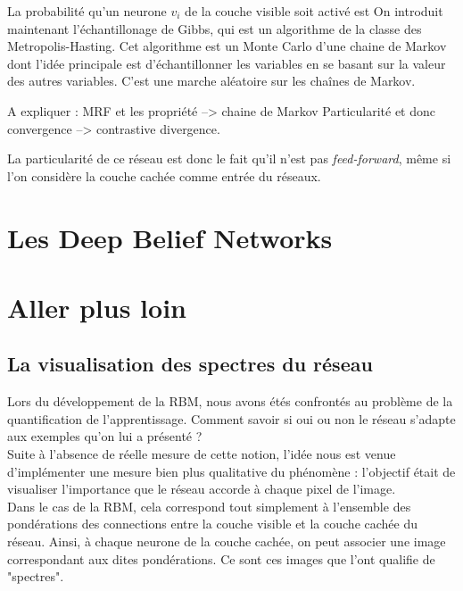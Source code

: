 \documentclass[a4paper,twoside]{report}
\begin{document}
                La probabilité qu'un neurone \begin{math}v_{i}\end{math} de la
                couche visible soit activé est 
                On introduit maintenant l'échantillonage de Gibbs, qui est un
                algorithme de la classe des Metropolis-Hasting. Cet algorithme
                est un Monte Carlo d'une chaine de Markov dont l'idée principale
                est d'échantillonner les variables en se basant sur la valeur
                des autres variables. C'est une marche aléatoire sur les chaînes
                de Markov.

                A expliquer : MRF et les propriété --> chaine de Markov
                Particularité et donc convergence --> contrastive divergence.

                La particularité de ce réseau est donc le fait qu'il n'est pas
                \textit{feed-forward}, même si l'on considère la couche cachée comme entrée du
                réseaux.



        \chapter{Les Deep Belief Networks}



        \chapter{Aller plus loin}

            \section{La visualisation des spectres du réseau}

                Lors du développement de la RBM, nous avons étés confrontés au problème de la quantification de l'apprentissage. Comment savoir si oui ou non le réseau s'adapte aux exemples qu'on lui a présenté ?\\

                Suite à l'absence de réelle mesure de cette notion, l'idée nous est venue d'implémenter une mesure bien plus qualitative du phénomène : l'objectif était de visualiser l'importance que le réseau accorde à chaque pixel de l'image.\\

                Dans le cas de la RBM, cela correspond tout simplement à l'ensemble des pondérations des connections entre la couche visible et la couche cachée du réseau. Ainsi, à chaque neurone de la couche cachée, on peut associer une image correspondant aux dites pondérations. Ce sont ces images que l'ont qualifie de "spectres".
\end{document}
